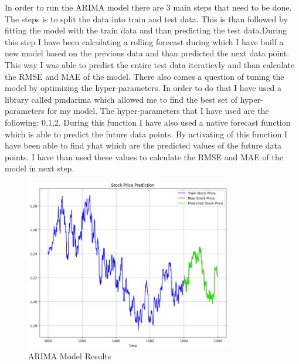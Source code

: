 \documentclass{imc-inf}
\begin{document}
	In order to run the ARIMA model there are 3 main steps that need to be done. The steps is to split the data into train and test data. This is than followed by fitting the model with the train data
	and than predicting the test data.During this step I have been calculating a rolling forecast during which I have builf a new model based on the previous data and than predicted 
	the next data point. This way I was able to predict the entire test data iteratievly and than calculate the RMSE and MAE of the model. There also comes a question of tuning the
	model by optimizing the hyper-parameters. In order to do that I have used a library called pmdarima which allowed me to find the best set of hyper-parameters for my model.
	The hyper-parameters that I have used are the following: 0,1,2. During this function I have also used a native forecast function which is able to predict the future data points.
	By activating of this function I have been able to find yhat which are the predicted values of the future data points. I have than used these values to calculate the RMSE and MAE
	of the model in next step.
	
	\begin{figure}
		\centering
		\includegraphics[width=0.8\textwidth]{arima_chart.png}
		\caption{ARIMA Model Results}
		\label{fig:arima_model_plots}
	\end{figure}
	
\end{document}
